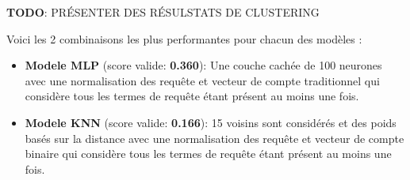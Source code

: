\textbf{TODO}: PRÉSENTER DES RÉSULSTATS DE CLUSTERING

Voici les 2 combinaisons les plus performantes pour chacun des modèles :

\begin{itemize}
  \item \textbf{Modele MLP} (score valide: \textbf{0.360}): Une couche cachée de 100 neurones avec une normalisation des requête et vecteur de compte traditionnel qui considère tous les termes de requête étant présent au moins une fois.
  \item \textbf{Modele KNN} (score valide: \textbf{0.166}): 15 voisins sont considérés et des poids basés sur la distance avec une normalisation des requête et vecteur de compte binaire qui considère tous les termes de requête étant présent au moins une fois.
\end{itemize}




